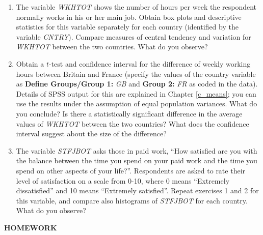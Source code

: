 \begin{enumerate}
\item
The variable \emph{WKHTOT} shows the
number of hours per week the respondent normally works in his
or her main job.
Obtain box plots and descriptive statistics for
this variable separately for each country
(identified by the variable \emph{CNTRY}).
Compare measures of central tendency and variation for \emph{WKHTOT}
between the two countries.
What do you observe?
\item
Obtain a $t$-test and confidence interval for the difference of
weekly working hours between Britain and France
(specify the values of the country variable as
\textbf{Define Groups/Group 1:} \emph{GB} and
\textbf{Group 2:} \emph{FR} as coded in the data).
Details of SPSS output for this are explained in Chapter \ref{c_means};
you can use the results under
the assumption of equal population variances.
What do you conclude?
Is there a statistically significant difference in the average values
of \emph{WKHTOT} between the two countries? What does the confidence
interval suggest about the size of the difference?
\item
The variable \emph{STFJBOT} asks those in paid work,
``How satisfied are you with the balance between the
time you spend on your paid work and the time you spend on
other aspects of your life?''. Respondents are asked to rate their
level of satisfaction on a scale from 0-10, where
0 means ``Extremely dissatisfied'' and 10 means ``Extremely satisfied''.
Repeat exercises 1 and 2 for this variable, and
compare also histograms of \emph{STFJBOT} for each country. What do you
observe?
\end{enumerate}


\textbf{HOMEWORK}

